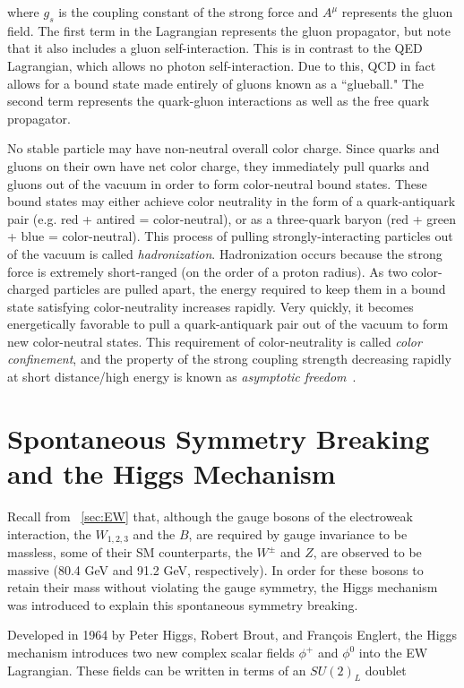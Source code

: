 \noindent where $g_{s}$ is the coupling constant of the strong force and $A^{\mu}$ represents the gluon field. The first term in the Lagrangian represents the gluon propagator, but note that it also includes a gluon self-interaction. This is in contrast to the QED Lagrangian, which allows no photon self-interaction. Due to this, QCD in fact allows for a bound state made entirely of gluons known as a ``glueball." The second term represents the quark-gluon interactions as well as the free quark propagator.

No stable particle may have non-neutral overall color charge. Since quarks and gluons on their own have net color charge, they immediately pull quarks and gluons out of the vacuum in order to form color-neutral bound states. These bound states may either achieve color neutrality in the form of a quark-antiquark pair (e.g. red + antired = color-neutral), or as a three-quark baryon (red + green + blue = color-neutral). This process of pulling strongly-interacting particles out of the vacuum is called \textit{hadronization}. Hadronization occurs because the strong force is extremely short-ranged (on the order of a proton radius). As two color-charged particles are pulled apart, the energy required to keep them in a bound state satisfying color-neutrality increases rapidly. Very quickly, it becomes energetically favorable to pull a quark-antiquark pair out of the vacuum to form new color-neutral states. This requirement of color-neutrality is called \textit{color confinement}, and the property of the strong coupling strength decreasing rapidly at short distance/high energy is known as \textit{asymptotic freedom}~\cite{halzen}.


\section{Spontaneous Symmetry Breaking and the Higgs Mechanism}

Recall from ~\ref{sec:EW} that, although the gauge bosons of the electroweak interaction, the $W_{1,2,3}$ and the $B$, are required by gauge invariance to be massless, some of their SM counterparts, the $W^{\pm}$ and $Z$, are observed to be massive (80.4 GeV and 91.2 GeV, respectively). In order for these bosons to retain their mass without violating the gauge symmetry, the Higgs mechanism was introduced to explain this spontaneous symmetry breaking.

Developed in 1964 by Peter Higgs, Robert Brout, and Fran\c{c}ois Englert, the Higgs mechanism introduces two new complex scalar fields $\phi^{+}$ and $\phi^0$ into the EW Lagrangian. These fields can be written in terms of an $SU(2)_L$ doublet 

